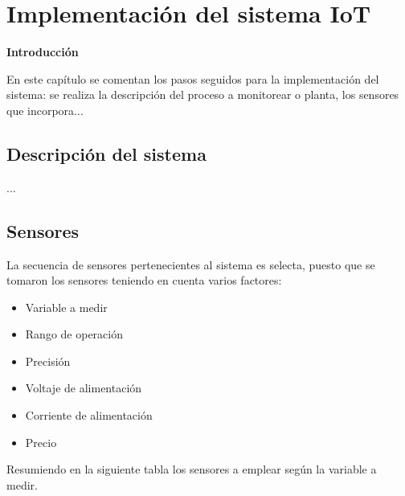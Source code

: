 \chapter{Implementación del sistema IoT}\label{cap: }

        \textbf{\Large Introducción}\newline
        
        En este capítulo se comentan los pasos seguidos para la implementación del sistema: se realiza la descripción del proceso a monitorear o planta, los sensores que incorpora...

\section{Descripción del sistema}

    ...


\section{Sensores} \label{sec: sensores}

    La secuencia de sensores pertenecientes al sistema es selecta, puesto que se tomaron los sensores teniendo en cuenta varios factores:

    \begin{itemize}
        \item Variable a medir
        \item Rango de operación
        \item Precisión
        \item Voltaje de alimentación
        \item Corriente de alimentación
        \item Precio
    \end{itemize}

    \vspace{1cm}

    Resumiendo en la siguiente tabla los sensores a emplear según la variable a medir.

